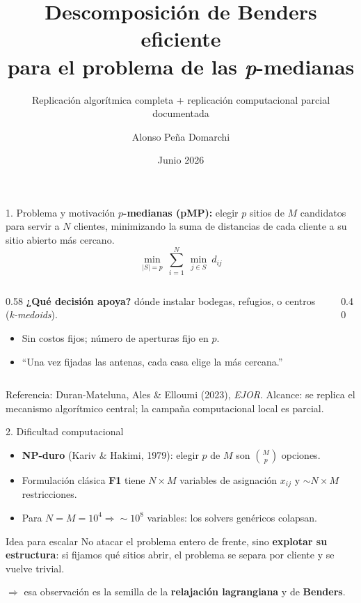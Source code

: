 \documentclass[10pt,aspectratio=169]{beamer}
\title[Benders para p-medianas]{Descomposición de Benders eficiente\\para el problema de las \textit{p}-medianas}
\subtitle{Replicación algorítmica completa + replicación computacional parcial documentada}
\author{Alonso Peña Domarchi}
\institute[PUCV]{Optimización Computacional — PUCV}
\date{Junio 2026}
\begin{document}
\begin{frame}\titlepage\end{frame}

\begin{frame}{1. Problema y motivación}
\textbf{$p$-medianas (pMP):} elegir $p$ sitios de $M$ candidatos para servir a $N$ clientes,
minimizando la suma de distancias de cada cliente a su sitio abierto más cercano.
\[
  \min_{|S|=p}\ \sum_{i=1}^{N}\ \min_{j\in S}\ d_{ij}
\]
\begin{columns}
\begin{column}{0.58\textwidth}
\textbf{¿Qué decisión apoya?} dónde instalar bodegas, refugios, o centros (\textit{k-medoids}).
\begin{itemize}
  \item Sin costos fijos; número de aperturas fijo en $p$.
  \item ``Una vez fijadas las antenas, cada casa elige la más cercana.''
\end{itemize}
\end{column}
\begin{column}{0.40\textwidth}
\centering
{}
\end{column}
\end{columns}
\vfill
\footnotesize Referencia: Duran-Mateluna, Ales \& Elloumi (2023), \textit{EJOR}. Alcance: se replica el mecanismo algorítmico central; la campaña computacional local es parcial.
\end{frame}

\begin{frame}{2. Dificultad computacional}
\begin{itemize}
  \item \textbf{NP-duro} (Kariv \& Hakimi, 1979): elegir $p$ de $M$ son $\binom{M}{p}$ opciones.
  \item Formulación clásica \textbf{F1} tiene $N\times M$ variables de asignación $x_{ij}$ y
        $\sim N\times M$ restricciones.
  \item Para $N=M=10^4 \Rightarrow \sim 10^8$ variables: los solvers genéricos colapsan.
\end{itemize}
\begin{block}{Idea para escalar}
No atacar el problema entero de frente, sino \textbf{explotar su estructura}: si fijamos qué
sitios abrir, el problema se separa por cliente y se vuelve trivial.
\end{block}
$\Rightarrow$ esa observación es la semilla de la \textbf{relajación lagrangiana} y de
\textbf{Benders}.
\end{frame}
\end{document}
